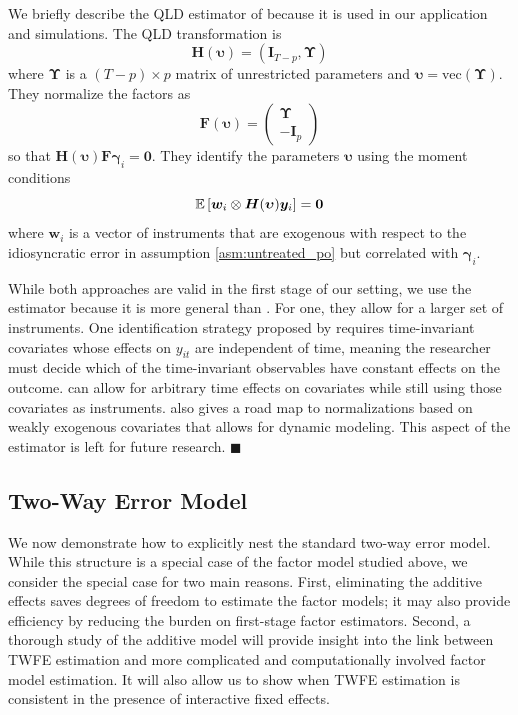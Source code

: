 \documentclass[12pt]{article}
\begin{document}
\begin{remark}\label{remark:QLD}
We briefly describe the QLD estimator of \citet{Ahn_Lee_Schmidt_2013} because it is used in our application and simulations. The QLD transformation is 
  \begin{equation}
  \bm H(\bm \upsilon) = (\bm I_{T-p}, \bm \Upsilon)
\end{equation}
where $\bm \Upsilon$ is a $(T-p) \times p$ matrix of unrestricted parameters and $\bm \upsilon = \text{vec}(\bm \Upsilon)$. They normalize the factors as 
\begin{equation}
  \bm F(\bm \upsilon) = 
  \begin{pmatrix}
    \bm \Upsilon\\
    -\bm I_p
  \end{pmatrix}
\end{equation}
so that $\bm H(\bm \upsilon) \bm F \bm \gamma_i = \bm 0$. They identify the parameters $\bm \upsilon$ using the moment conditions 
\begin{equation}
  \mathbb{E}\left[\bm w_i \otimes \bm H(\bm \upsilon) \bm y_i\right] = \bm 0
\end{equation}
where $\bm w_i$ is a vector of instruments that are exogenous with respect to the idiosyncratic error in assumption \ref{asm:untreated_po} but correlated with $\bm \gamma_i$.

While both approaches are valid in the first stage of our setting, we use the \citet{Ahn_Lee_Schmidt_2013} estimator because it is more general than \citet{Callaway_Karami_2020}. For one, they allow for a larger set of instruments. One identification strategy proposed by \citet{Callaway_Karami_2020} requires time-invariant covariates whose effects on $y_{it}$ are independent of time, meaning the researcher must decide which of the time-invariant observables have constant effects on the outcome. \citet{Ahn_Lee_Schmidt_2013} can allow for arbitrary time effects on covariates while still using those covariates as instruments. \citet{Ahn_Lee_Schmidt_2013} also gives a road map to normalizations based on weakly exogenous covariates that allows for dynamic modeling. This aspect of the estimator is left for future research.
$\blacksquare$
\end{remark}


\subsection{Two-Way Error Model}

We now demonstrate how to explicitly nest the standard two-way error model. While this structure is a special case of the factor model studied above, we consider the special case for two main reasons. First, eliminating the additive effects saves degrees of freedom to estimate the factor models; it may also provide efficiency by reducing the burden on first-stage factor estimators. Second, a thorough study of the additive model will provide insight into the link between TWFE estimation and more complicated and computationally involved factor model estimation. It will also allow us to show when TWFE estimation is consistent in the presence of interactive fixed effects. 
\end{document}
